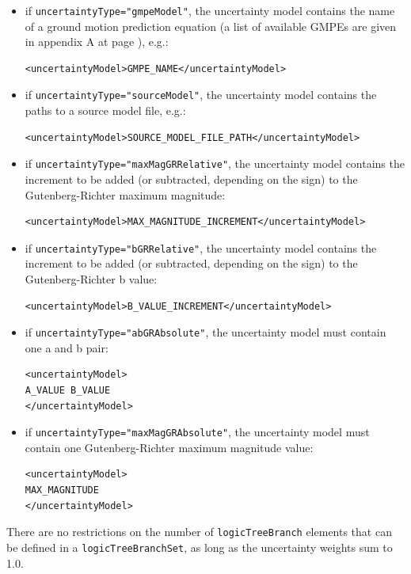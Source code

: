 \begin{itemize}
\item if \Verb+uncertaintyType="gmpeModel"+, the uncertainty model 
contains the name of a ground motion prediction equation (a list of 
available GMPEs are given in appendix A at page 
\pageref{sec:gmpes_list}), e.g.:
\begin{Verbatim}[frame=single, commandchars=\\\{\}]
<uncertaintyModel>GMPE_NAME</uncertaintyModel>
\end{Verbatim}
\item if \Verb+uncertaintyType="sourceModel"+, the uncertainty model contains 
the paths to a source model file, e.g.:
\begin{Verbatim}[frame=single, commandchars=\\\{\}]
<uncertaintyModel>SOURCE_MODEL_FILE_PATH</uncertaintyModel>
\end{Verbatim}
\item if \Verb+uncertaintyType="maxMagGRRelative"+, the uncertainty model 
contains the increment to be added (or subtracted, depending on the sign) 
to the Guten\-berg-Richter maximum magnitude:
\begin{Verbatim}[frame=single, commandchars=\\\{\}, samepage=true]
<uncertaintyModel>MAX_MAGNITUDE_INCREMENT</uncertaintyModel>
\end{Verbatim}
\item if \Verb+uncertaintyType="bGRRelative"+, the uncertainty model 
contains the increment to be added (or subtracted, depending on the 
sign) to the Guten\-berg-Richter b value:
\begin{Verbatim}[frame=single, commandchars=\\\{\}, samepage=true]
<uncertaintyModel>B_VALUE_INCREMENT</uncertaintyModel>
\end{Verbatim}
\item if \Verb+uncertaintyType="abGRAbsolute"+, the uncertainty model 
must contain one a and b pair:
\begin{Verbatim}[frame=single, commandchars=\\\{\}, samepage=true]
<uncertaintyModel>
A_VALUE B_VALUE
</uncertaintyModel>
\end{Verbatim}
    \item if \Verb+uncertaintyType="maxMagGRAbsolute"+, the uncertainty 
    model must contain one Guten\-berg-Richter maximum 
    magnitude value:
%
\begin{Verbatim}[frame=single, commandchars=\\\{\}, samepage=true]
<uncertaintyModel>
MAX_MAGNITUDE
</uncertaintyModel>
\end{Verbatim}
\end{itemize}
%
There are no restrictions on the number of \Verb+logicTreeBranch+ elements 
that can be defined in a \Verb+logicTreeBranchSet+, as long as the uncertainty 
weights sum to 1.0.

